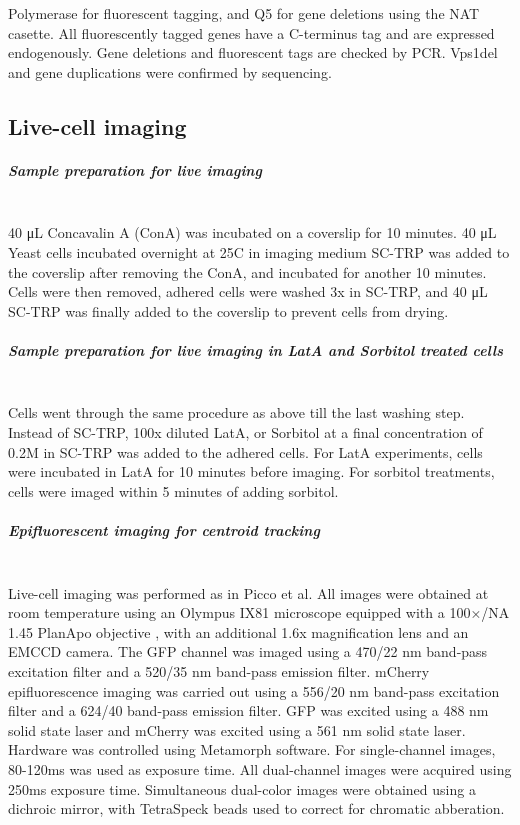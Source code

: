 Polymerase for fluorescent tagging, and Q5 for gene deletions using the NAT casette. 
All fluorescently tagged genes have a C-terminus tag and are expressed endogenously.
Gene deletions and fluorescent tags are checked by PCR. Vps1del and gene duplications were confirmed by sequencing. 

\subsection{Live-cell imaging}
\subparagraph{Sample preparation for live imaging}
			\mbox{}\\
40 μL Concavalin A (ConA) was incubated on a coverslip for 10 minutes. 40 μL Yeast cells incubated overnight at 25C in imaging medium SC-TRP was added to the coverslip after removing the ConA, and incubated for another 10 minutes. Cells were then removed, adhered cells were washed 3x in SC-TRP, and 40 μL SC-TRP was finally added to the coverslip to prevent cells from drying. 

\subparagraph{Sample preparation for live imaging in LatA and Sorbitol treated cells}
\mbox{}\\
Cells went through the same procedure as above till the last washing step. Instead of SC-TRP, 100x diluted LatA, or Sorbitol at a final concentration of 0.2M in SC-TRP was added to the adhered cells. For LatA experiments, cells were incubated in LatA for 10 minutes before imaging. For sorbitol treatments, cells were imaged within 5 minutes of adding sorbitol.

\subparagraph{Epifluorescent imaging for centroid tracking}
			\mbox{}\\
Live-cell imaging was performed as in Picco et al. All images were obtained at room temperature using an Olympus IX81 microscope equipped with a 100×/NA 1.45 PlanApo objective , with an additional 1.6x magnification lens and an EMCCD camera. The GFP channel was imaged using a 470/22 nm band-pass excitation filter and a 520/35 nm band-pass emission filter. mCherry epifluorescence imaging was carried out using a 556/20 nm band-pass excitation filter and a 624/40 band-pass emission filter. GFP was excited using a 488 nm solid state laser and mCherry was excited using a 561 nm solid state laser. Hardware was controlled using Metamorph software. For single-channel images, 80-120ms was used as exposure time. All dual-channel images were acquired using 250ms exposure time. Simultaneous dual-color images were obtained using a dichroic mirror, with TetraSpeck beads used to correct for chromatic abberation.

